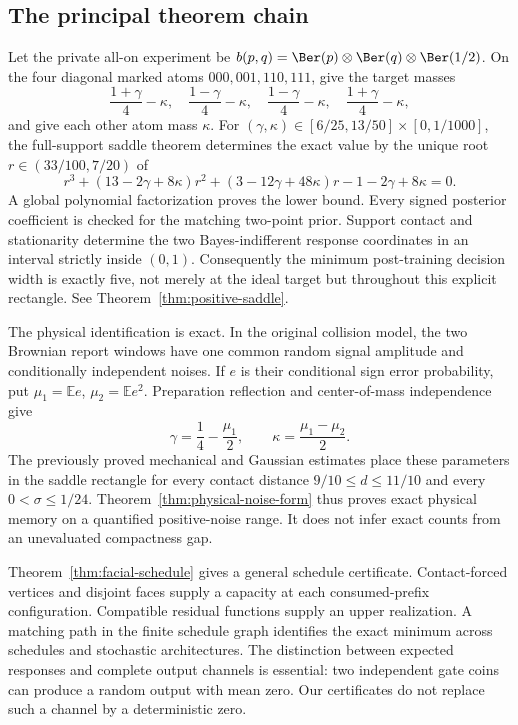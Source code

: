 \subsection{The principal theorem chain}
Let the private all-on experiment be
$b(p,q)=\Ber(p)\otimes\Ber(q)\otimes\Ber(1/2)$. On the four diagonal
marked atoms $000,001,110,111$, give the target masses
\[
 \frac{1+\gamma}{4}-\kappa,\quad
 \frac{1-\gamma}{4}-\kappa,\quad
 \frac{1-\gamma}{4}-\kappa,\quad
 \frac{1+\gamma}{4}-\kappa,
\]
and give each other atom mass $\kappa$. For
$(\gamma,\kappa)\in[6/25,13/50]\times[0,1/1000]$, the full-support
saddle theorem determines the exact value by the unique root
$r\in(33/100,7/20)$ of
\[
 r^3+(13-2\gamma+8\kappa)r^2
       +(3-12\gamma+48\kappa)r-1-2\gamma+8\kappa=0.
\]
A global polynomial factorization proves the lower bound. Every signed
posterior coefficient is checked for the matching two-point prior.
Support contact and stationarity determine the two Bayes-indifferent
response coordinates in an interval strictly inside $(0,1)$.
Consequently the minimum post-training decision width is exactly five,
not merely at the ideal target but throughout this explicit rectangle.
See Theorem~\ref{thm:positive-saddle}.

The physical identification is exact. In the original collision model,
the two Brownian report windows have one common random signal amplitude
and conditionally independent noises. If $e$ is their conditional sign
error probability, put $\mu_1=\mathbb E e$, $\mu_2=\mathbb E e^2$.
Preparation reflection and center-of-mass independence give
\[
 \gamma=\frac14-\frac{\mu_1}{2},\qquad
 \kappa=\frac{\mu_1-\mu_2}{2}.
\]
The previously proved mechanical and Gaussian estimates place these
parameters in the saddle rectangle for every contact distance
$9/10\le d\le11/10$ and every $0<\sigma\le1/24$.
Theorem~\ref{thm:physical-noise-form} thus proves exact physical memory
on a quantified positive-noise range. It does not infer exact counts
from an unevaluated compactness gap.

Theorem~\ref{thm:facial-schedule} gives a general schedule certificate.
Contact-forced vertices and disjoint faces supply a capacity at each
consumed-prefix configuration. Compatible residual functions supply an
upper realization. A matching path in the finite schedule graph
identifies the exact minimum across schedules and stochastic
architectures. The distinction between expected responses and complete
output channels is essential: two independent gate coins can produce
a random output with mean zero. Our certificates do not replace such
a channel by a deterministic zero.

